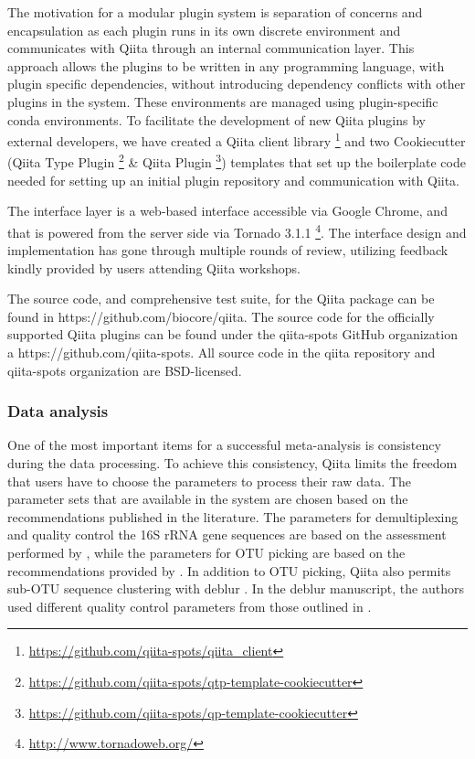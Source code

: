 The motivation for a modular plugin system is separation of concerns and encapsulation
as each plugin runs in its own discrete environment and communicates with Qiita through
an internal communication layer. This approach allows the plugins to be written in any
programming language, with plugin specific dependencies, without introducing dependency
conflicts with other plugins in the system. These environments are managed using
plugin-specific conda environments. To facilitate the development of new Qiita plugins
by external developers, we have created a Qiita client
library \footnote{\url{https://github.com/qiita-spots/qiita_client}} and two Cookiecutter
(Qiita Type Plugin \footnote{\url{https://github.com/qiita-spots/qtp-template-cookiecutter}}
\& Qiita Plugin \footnote{\url{https://github.com/qiita-spots/qp-template-cookiecutter}})
templates that set up the boilerplate code needed for setting up an initial
plugin repository and communication with Qiita.

The interface layer is a web-based interface accessible via Google Chrome,
and that is powered from the server side via Tornado 3.1.1 \footnote{\url{http://www.tornadoweb.org/}}.
The interface design and implementation has gone through multiple rounds of review,
utilizing feedback kindly provided by users attending Qiita workshops.

The source code, and comprehensive test suite, for the Qiita package can be found
in https://github.com/biocore/qiita. The source code for the officially supported
Qiita plugins can be found under the qiita-spots GitHub organization a
https://github.com/qiita-spots. All source code in the qiita repository and
qiita-spots organization are BSD-licensed.

\subsubsection{Data analysis}

One of the most important items for a successful meta-analysis is consistency
during the data processing. To achieve this consistency, Qiita limits the freedom
that users have to choose the parameters to process their raw data. The parameter
sets that are available in the system are chosen based on the recommendations
published in the literature. The parameters for demultiplexing and quality
control the 16S rRNA gene sequences are based on the assessment
performed by \cite{Bokulich2013}, while the parameters for OTU picking are based
on the recommendations provided by \cite{Navas-Molina2013}. In addition to OTU
picking, Qiita also permits sub-OTU sequence clustering with deblur \cite{Amir2017}.
In the deblur manuscript, the authors used different quality control parameters from
those outlined in \cite{Bokulich2013}.

